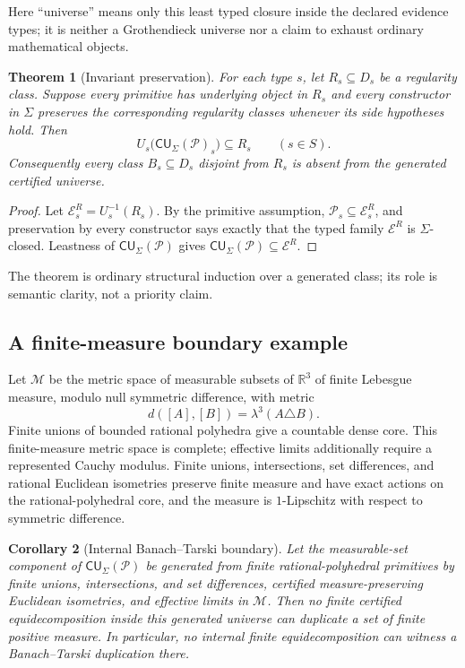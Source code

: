 \documentclass[11pt]{article}
\newtheorem{theorem}{Theorem}[section]
\newtheorem{corollary}[theorem]{Corollary}
\theoremstyle{definition}
\newcommand{\R}{\mathbb{R}}
\begin{document}
Here ``universe'' means only this least typed closure inside the declared evidence types;
it is neither a Grothendieck universe nor a claim to exhaust ordinary mathematical
objects.

\begin{theorem}[Invariant preservation]\label{thm:preservation}
For each type $s$, let $R_s\subseteq D_s$ be a regularity class.  Suppose every primitive
has underlying object in $R_s$ and every constructor in $\Sigma$ preserves the
corresponding regularity classes whenever its side hypotheses hold.  Then
\[
 U_s\bigl(\mathsf{CU}_\Sigma(\mathcal P)_s\bigr)\subseteq R_s
 \qquad(s\in S).
\]
Consequently every class $B_s\subseteq D_s$ disjoint from $R_s$ is absent from the
generated certified universe.
\end{theorem}

\begin{proof}
Let $\mathcal E_s^R=U_s^{-1}(R_s)$.  By the primitive assumption,
$\mathcal P_s\subseteq\mathcal E_s^R$, and preservation by every constructor says exactly
that the typed family $\mathcal E^R$ is $\Sigma$-closed.  Leastness of
$\mathsf{CU}_\Sigma(\mathcal P)$ gives
$\mathsf{CU}_\Sigma(\mathcal P)\subseteq\mathcal E^R$.
\end{proof}

The theorem is ordinary structural induction over a generated class; its role is semantic
clarity, not a priority claim.

\subsection{A finite-measure boundary example}

Let $\mathcal M$ be the metric space of measurable subsets of $\R^3$ of finite
Lebesgue measure, modulo null symmetric difference, with metric
\[
 d([A],[B])=\lambda^3(A\triangle B).
\]
Finite unions of bounded rational polyhedra give a countable dense core.  This finite-measure metric space is complete; effective limits additionally require a
represented Cauchy modulus.  Finite unions, intersections, set differences, and rational
Euclidean isometries preserve finite measure and have exact actions on the rational-polyhedral
core, and the measure is
$1$-Lipschitz with respect to symmetric difference.

\begin{corollary}[Internal Banach--Tarski boundary]\label{cor:BT}
Let the measurable-set component of $\mathsf{CU}_\Sigma(\mathcal P)$ be generated from
finite rational-polyhedral primitives by finite unions, intersections, and set differences,
certified measure-preserving Euclidean isometries, and effective limits in $\mathcal M$.  Then no finite certified equidecomposition inside this generated universe can
duplicate a set of finite positive measure.  In particular, no internal finite
equidecomposition can witness a Banach--Tarski duplication there.
\end{corollary}
\end{document}
